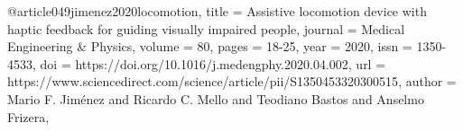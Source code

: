 @article{049jimenez2020locomotion,
title = {Assistive locomotion device with haptic feedback for guiding visually impaired people},
journal = {Medical Engineering \& Physics},
volume = {80},
pages = {18-25},
year = {2020},
issn = {1350-4533},
doi = {https://doi.org/10.1016/j.medengphy.2020.04.002},
url = {https://www.sciencedirect.com/science/article/pii/S1350453320300515},
author = {Mario F. Jiménez and Ricardo C. Mello and Teodiano Bastos and Anselmo Frizera},
}